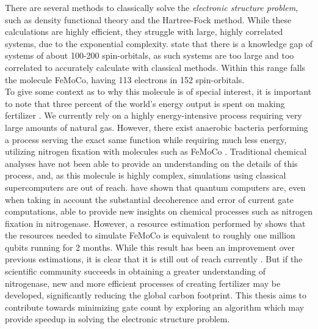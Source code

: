 There are several methods to classically solve the \textit{electronic structure problem}, such as density functional theory and the Hartree-Fock method. While these calculations are highly efficient, they struggle with large, highly correlated systems, due to the exponential complexity. \textcite{McArdle} state that there is a knowledge gap of systems of about 100-200 spin-orbitals, as such systems are too large and too correlated to accurately calculate with classical methods. Within this range falls the molecule FeMoCo, having 113 electrons in 152 spin-orbitals. \\ To give some context as to why this molecule is of special interest, it is important to note that three percent of the world's energy output is spent on making fertilizer \cite{reiher}.   We currently rely on a highly energy-intensive process requiring very large amounts of natural gas. However, there exist anaerobic bacteria performing a process serving the exact same function while requiring much less energy, utilizing nitrogen fixation with molecules such as FeMoCo \cite{McArdle}. Traditional chemical analyses have not been able to provide an understanding on the details of this process, and, as this molecule is highly complex, simulations using classical supercomputers are out of reach. \textcite{reiher} have shown that quantum computers are, even when taking in account the substantial decoherence and error of current gate computations, able to provide new insights on chemical processes such as nitrogen fixation in nitrogenase. However, a resource estimation performed by \textcite{berry} shows that the resources needed to simulate FeMoCo is equivalent to roughly one million qubits running for 2 months. While this result has been an improvement over previous estimations, it is clear that it is still out of reach currently \cite{McArdle}. But if the scientific community succeeds in obtaining a greater understanding of nitrogenase, new and more efficient processes of creating fertilizer may be developed, significantly reducing the global carbon footprint. This thesis aims to contribute towards minimizing gate count by exploring an algorithm which may provide speedup in solving the electronic structure problem.

\vspace{5mm}

